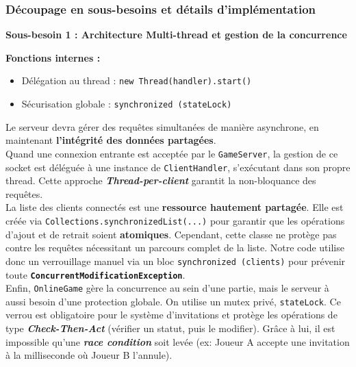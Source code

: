 \documentclass[a4paper]{article}
\begin{document}
\subsubsection{Découpage en sous-besoins et détails d'implémentation}

\begin{besoinbox}
    \textbf{\large Sous-besoin 1 : Architecture Multi-thread et gestion de la concurrence}
    
    \vspace{2mm}
    \textbf{Fonctions internes :}
    \begin{itemize}
        \item Délégation au thread : \texttt{new Thread(handler).start()}
        \item Sécurisation globale : \texttt{synchronized (stateLock)}
    \end{itemize}
    \vspace{2mm}

    Le serveur devra gérer des requêtes simultanées de manière asynchrone, en maintenant \textbf{l'intégrité des données partagées}. \\
    
    Quand une connexion entrante est acceptée par le \texttt{GameServer}, la gestion de ce socket est déléguée à une instance de \texttt{ClientHandler}, s'exécutant dans son propre thread. Cette approche \textbf{\textit{Thread-per-client}} garantit la non-bloquance des requêtes.\\

    La liste des clients connectés est une \textbf{ressource hautement partagée}. Elle est créée via \texttt{Collections.synchronizedList(...)} pour garantir que les opérations d'ajout et de retrait soient \textbf{atomiques}. Cependant, cette classe ne protège pas contre les requêtes nécessitant un parcours complet de la liste. Notre code utilise donc un verrouillage manuel via un bloc \texttt{synchronized (clients)} pour prévenir toute \textbf{\texttt{ConcurrentModificationException}}.\\

    Enfin, \texttt{OnlineGame} gère la concurrence au sein d'une partie, mais le serveur à aussi besoin d'une protection globale. On utilise un mutex privé, \texttt{stateLock}. Ce verrou est obligatoire pour le système d'invitations et protège les opérations de type \textbf{\textit{Check-Then-Act}} (vérifier un statut, puis le modifier). Grâce à lui, il est impossible qu'une \textbf{\textit{race condition}} soit levée (ex: Joueur A accepte une invitation à la milliseconde où Joueur B l'annule).
\end{besoinbox}
\end{document}
